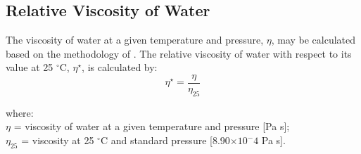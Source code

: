 \subsection{Relative Viscosity of Water}
\label{sec:eta}
The viscosity of water at a given temperature and pressure, $\eta$, may be calculated based on the methodology of \cite{huber09}. The relative viscosity of water with respect to its value at 25 ${}^\circ$C, $\eta^\star$, is calculated by:
%
\begin{equation}
\label{eq:ns}
    \eta^\star = \frac{\eta}{\eta_{25}}
\end{equation}

\noindent where:\\
\indent $\eta$ = viscosity of water at a given temperature and pressure [Pa s];\\
\indent $\eta_{25}$ = viscosity at 25 ${}^\circ$C and standard pressure [8.90$\times 10^-4$ Pa s].\\

